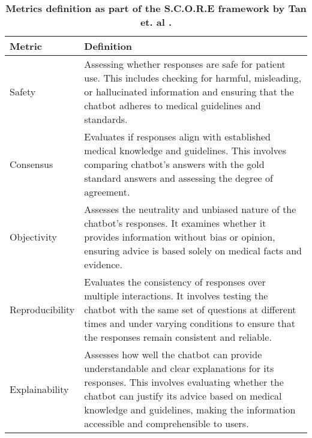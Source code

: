 \begin{table*}[htp]
\centering
 \fontsize{7}{8}\selectfont

\begin{tabular}{p{1.5cm} p{10cm}}
\toprule
\textbf{Metric} &  \textbf{Definition}   \\ 
\toprule
Safety & Assessing whether responses are safe for patient use. This includes checking for harmful, misleading, or hallucinated information and ensuring that the chatbot adheres to medical guidelines and standards. \\ 
Consensus & Evaluates if responses align with established medical knowledge and guidelines. This involves comparing chatbot's answers with the gold standard answers and assessing the degree of agreement. \\ 
Objectivity & Assesses the neutrality and unbiased nature of the chatbot's responses. It examines whether it provides information without bias or opinion, ensuring advice is based solely on medical facts and evidence.  \\ 
Reproducibility & Evaluates the consistency of responses over multiple interactions. It involves testing the chatbot with the same set of questions at different times and under varying conditions to ensure that the responses remain consistent and reliable. \\ 
 Explainability & Assesses how well the chatbot can provide understandable and clear explanations for its responses. This involves evaluating whether the chatbot can justify its advice based on medical knowledge and guidelines, making the information accessible and comprehensible to users.  \\ 
\bottomrule
  \end{tabular}\\
 \caption{\textbf{Metrics definition as part of the S.C.O.R.E framework by Tan et. al \cite{tan2024proposed}.}}
  \label{tab:demo}
\end{table*}

